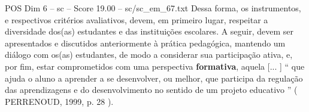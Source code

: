 \begin{textsample}{POS Dim 6 – sc – Score 19.00 – sc/sc\_em\_67.txt}
Dessa forma, os instrumentos, e respectivos critérios avaliativos, devem, em primeiro lugar, respeitar a diversidade dos(as) estudantes e das instituições escolares.
A seguir, devem ser apresentados e discutidos anteriormente à prática pedagógica, mantendo um diálogo com os(as) estudantes, de modo a considerar sua participação ativa, e, por fim, estar comprometidos com uma perspectiva \textbf{formativa}, aquela [... ] “ que ajuda o aluno a aprender a se desenvolver, ou melhor, que participa da regulação das aprendizagens e do desenvolvimento no sentido de um projeto educativo ” ( PERRENOUD, 1999, p. 28 ).

\end{textsample}
